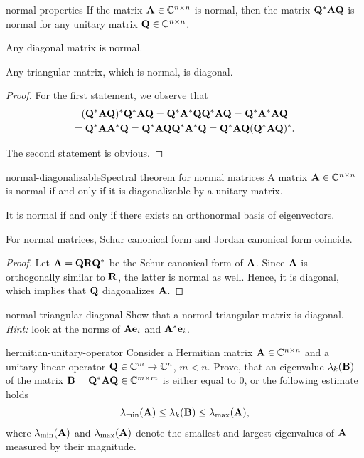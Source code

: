 \begin{Lemma}{normal-properties}
  If the matrix $\mathbf A\in\mathbb C^{n\times n}$ is normal, then the matrix
  $\mathbf Q^*\mathbf A\mathbf Q$ is normal for any unitary matrix $\mathbf Q\in\mathbb C^{n\times n}$.

  Any diagonal matrix is normal.

  Any triangular matrix, which is normal, is diagonal.
\end{Lemma}

\begin{proof}
  For the first statement, we observe that
  \begin{multline}
    (\mathbf Q^*\mathbf A\mathbf Q)^* \mathbf Q^*\mathbf A\mathbf Q
    = \mathbf Q^*\mathbf A^*\mathbf Q\mathbf Q^*\mathbf A\mathbf Q
    = \mathbf Q^*\mathbf A^*\mathbf A\mathbf Q\\
    = \mathbf Q^*\mathbf A\mathbf A^*\mathbf Q
    = \mathbf Q^*\mathbf A\mathbf Q\mathbf Q^*\mathbf A^*\mathbf Q 
    = \mathbf Q^*\mathbf A\mathbf Q(\mathbf Q^*\mathbf A\mathbf Q)^*. 
  \end{multline}

  The second statement is obvious.
\end{proof}

\begin{Theorem*}{normal-diagonalizable}{Spectral theorem for normal matrices}
  A matrix $\mathbf A\in\mathbb C^{n\times n}$ is normal if and only if it is diagonalizable by a unitary matrix.

  It is normal if and only if there exists an orthonormal basis of eigenvectors.

  For normal matrices, Schur canonical form and Jordan canonical form coincide.
\end{Theorem*}

\begin{proof}
  Let $\mathbf A = \mathbf Q\mathbf R\mathbf Q^*$ be the Schur canonical form of
  $\mathbf A$. Since $\mathbf A$ is orthogonally similar to $\mathbf R$, the
  latter is normal as well. Hence, it is diagonal, which implies that
  $\mathbf Q$ diagonalizes $\mathbf A$.
\end{proof}

\begin{Problem}{normal-triangular-diagonal}
	Show that a normal triangular matrix is diagonal. \textit{Hint:}
	look at the norms of $\mathbf A \mathbf e_i$ and $\mathbf A^*\mathbf e_i$.
\end{Problem}

\begin{Problem}{hermitian-unitary-operator}
	Consider a Hermitian matrix $\mathbf A\in\mathbb C^{n\times n}$ and a unitary
	linear operator $\mathbf Q\in\mathbb C^m\to\mathbb C^n$, $m<n$. Prove, that an
	eigenvalue $\lambda_k(\mathbf B)$ of the matrix
	$\mathbf B=\mathbf Q^*\mathbf A\mathbf Q\in\mathbb C^{m\times m}$ is either equal to 0,
	or the following estimate holds
	\begin{gather*}
	\lambda_{\min}(\mathbf A)
	\leq \lambda_{k}(\mathbf B)
	\leq \lambda_{\max}(\mathbf A),
	\end{gather*}
	where $\lambda_{\min}(\mathbf A)$ and $\lambda_{\max}(\mathbf A)$ denote
	the smallest and largest eigenvalues of $\mathbf A$ measured by their
	magnitude.
\end{Problem}


